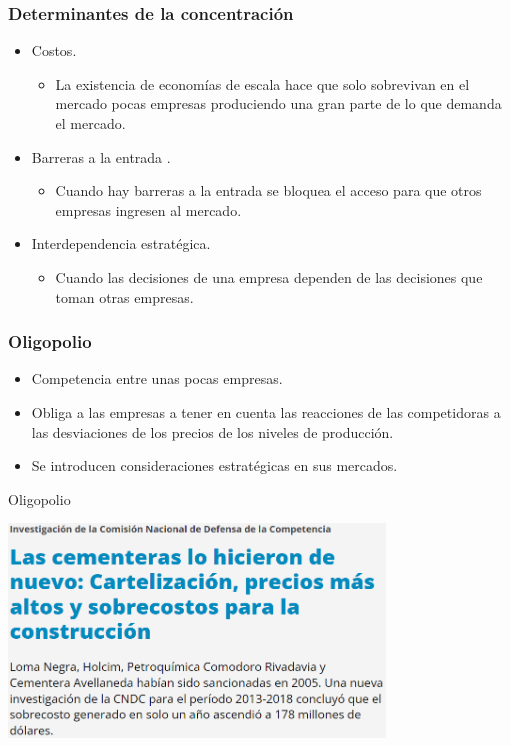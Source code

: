 \documentclass{beamer}
\begin{document}
\begin{frame}
\frametitle{Determinantes de la concentración}
    \begin{itemize}
        \item Costos.
            \begin{itemize}
            \item La existencia de economías de escala hace que solo sobrevivan en el mercado pocas empresas produciendo una gran parte de lo que demanda el mercado. 
            \end{itemize}
        \item Barreras a la entrada .
            \begin{itemize}
            \item Cuando hay barreras a la entrada se bloquea el acceso para que otros empresas ingresen al mercado.
            \end{itemize}
        \item Interdependencia estratégica.
            \begin{itemize}
            \item Cuando las decisiones de una empresa dependen de las decisiones que toman otras empresas. 
            \end{itemize}
    \end{itemize}
\end{frame}

\begin{frame}
\frametitle{Oligopolio}
\begin{itemize}
    \item Competencia entre unas pocas empresas.
    \item Obliga a las empresas a tener en cuenta las reacciones de las competidoras a las desviaciones de los precios de los niveles de producción.
    \item Se introducen consideraciones estratégicas en sus mercados.
\end{itemize}
\end{frame}

\begin{frame}{Oligopolio}
    \begin{center}
      \includegraphics[width=0.75\textwidth]{../Figures/cartel_cementeras.png}
    \end{center}
    \end{frame}
\end{document}
